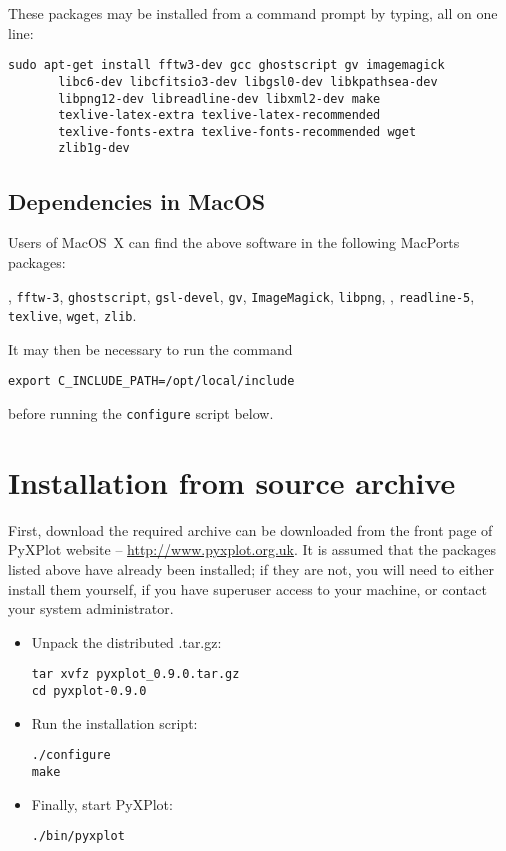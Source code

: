 \noindent These packages may be installed from a command prompt by typing, all on one line:

\begin{verbatim}
sudo apt-get install fftw3-dev gcc ghostscript gv imagemagick
       libc6-dev libcfitsio3-dev libgsl0-dev libkpathsea-dev
       libpng12-dev libreadline-dev libxml2-dev make
       texlive-latex-extra texlive-latex-recommended
       texlive-fonts-extra texlive-fonts-recommended wget
       zlib1g-dev
\end{verbatim}

\subsection{Dependencies in MacOS}

Users of MacOS~X can find the above software in the following MacPorts packages:

\vspace{2mm}
, {\tt fftw-3}, {\tt ghostscript}, {\tt gsl-devel}, {\tt gv}, {\tt ImageMagick}, {\tt libpng},\newline
{}, {\tt readline-5}, {\tt texlive}, {\tt wget}, {\tt zlib}.
\vspace{2mm}

It may then be necessary to run the command
\begin{verbatim}
export C_INCLUDE_PATH=/opt/local/include
\end{verbatim}
before running the {\tt configure} script below.

\section{Installation from source archive}

First, download the required archive can be downloaded from the front page of
PyXPlot website -- \url{http://www.pyxplot.org.uk}. It is assumed that the
packages listed above have already been installed; if they are not, you will
need to either install them yourself, if you have superuser access to your
machine, or contact your system administrator.

\begin{itemize}
\item Unpack the distributed .tar.gz:

\begin{verbatim}
tar xvfz pyxplot_0.9.0.tar.gz
cd pyxplot-0.9.0
\end{verbatim}

\item Run the installation script:

\begin{verbatim}
./configure
make
\end{verbatim}

\item Finally, start PyXPlot:

\begin{verbatim}
./bin/pyxplot
\end{verbatim}

\end{itemize}

